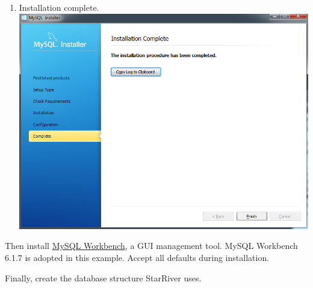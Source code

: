 \begin{enumerate}
\item
  Installation complete. \includegraphics{../img/mysql_11.png}
\end{enumerate}

Then install \href{http://dev.mysql.com/downloads/workbench/}{MySQL
Workbench}, a GUI management tool. MySQL Workbench 6.1.7 is adopted in
this example. Accept all defaults during installation.

Finally, create the database structure StarRiver uses.

